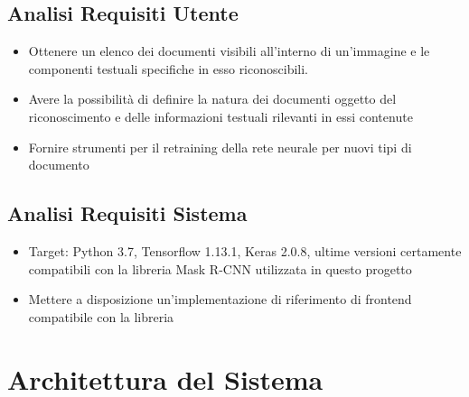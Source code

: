 \documentclass[12pt,A4]{article}
\begin{document}
\subsection{Analisi Requisiti Utente}

\begin{itemize}
    \item Ottenere un elenco dei documenti visibili all'interno di
        un'immagine e le componenti testuali specifiche in esso
        riconoscibili.
    \item Avere la possibilità di definire la natura dei documenti
        oggetto del riconoscimento e delle informazioni testuali
        rilevanti in essi contenute
    \item Fornire strumenti per il retraining della rete neurale per
        nuovi tipi di documento
\end{itemize}

\subsection{Analisi Requisiti Sistema}

\begin{itemize}
    \item Target: Python 3.7, Tensorflow 1.13.1, Keras 2.0.8, ultime
        versioni certamente compatibili con la libreria Mask
        \textsc{R-CNN} utilizzata in questo progetto
    \item Mettere a disposizione un'implementazione di riferimento di
        frontend compatibile con la libreria
\end{itemize}

\section{Architettura del Sistema}
\end{document}

